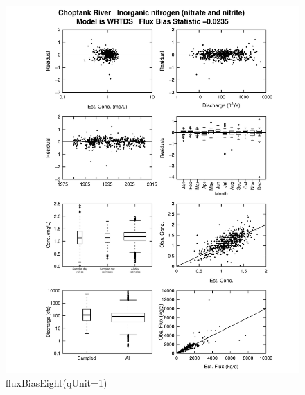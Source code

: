 \documentclass[a4paper,11pt]{article}\usepackage{graphicx, color}
\makeatletter
\def\maxwidth{ %
  \ifdim\Gin@nat@width>\linewidth
    \linewidth
  \else
    \Gin@nat@width
  \fi
}
\newenvironment{knitrout}{}{} %
\makeatother
\begin{document}
\begin{knitrout}
\color{fgcolor}\begin{figure}[]

\includegraphics[width=\maxwidth]{figure/fluxBiasEight} \caption[fluxBiasEight(qUnit=1)]{fluxBiasEight(qUnit=1)\label{fig:fluxBiasEight}}
\end{figure}


\end{knitrout}
\end{document}

